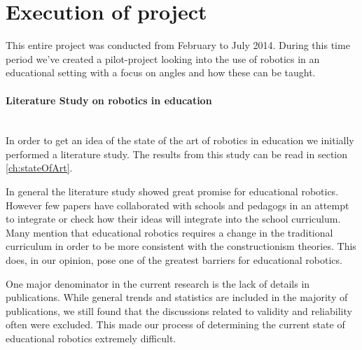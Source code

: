 \section{Execution of project}
This entire project was conducted from February to July 2014. During this time period we've created a pilot-project looking into the use of robotics in an educational setting with a focus on angles and how these can be taught.
%

\paragraph{Literature Study on robotics in education}~\\	
In order to get an idea of the state of the art of robotics in education we initially performed a literature study. The results from this study can be read in section \ref{ch:stateOfArt}. %

%

\bigskip\noindent
In general the literature study showed great promise for educational robotics. However few papers have collaborated with schools and pedagogs in an attempt to integrate or check how their ideas will integrate into the school curriculum. Many mention that educational robotics requires a change in the traditional curriculum in order to be more consistent with the constructionism theories. This does, in our opinion, pose one of the greatest barriers for educational robotics.

\bigskip\noindent
One major denominator in the current research is the lack of details in publications. While general trends and statistics are included in the majority of publications, we still found that the discussions related to validity and reliability often were excluded. This made our process of determining the current state of educational robotics extremely difficult. 


